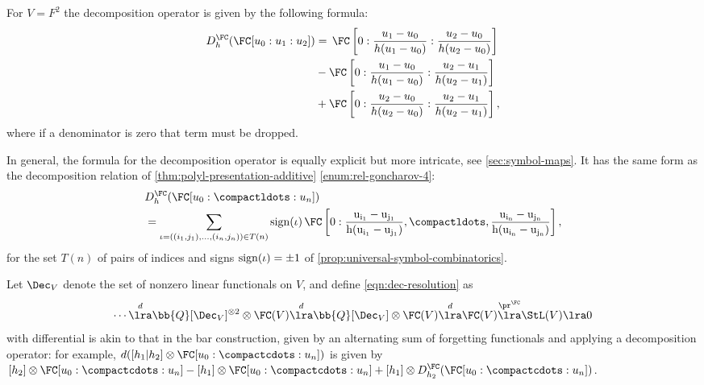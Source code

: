 \documentclass[a4paper]{amsart}
\begin{document}
\begin{example*}For $V = F^2$ the decomposition operator is given by the following formula:
\begin{align*}
D^\FC_h(\FC[u_0:u_1:u_2])
&=\,\FC\left[0:\frac{u_{1}-u_{0}}{h(u_{1}-u_0)}:\frac{u_{2}-u_{0}}{h(u_{2}-u_0)}\right]\\
&-\FC\left[0:\frac{u_{1}-u_{0}}{h(u_{1}-u_0)}:\frac{u_{2}-u_{1}}{h(u_{2}-u_1)}\right]\\
&+\FC\left[0:\frac{u_{2}-u_{0}}{h(u_{2}-u_0)}:\frac{u_{2}-u_{1}}{h(u_{2}-u_1)}\right],
\end{align*}
where if a denominator is zero that term must be dropped.
\end{example*}

In general, the formula for the decomposition operator is equally explicit but more intricate, see \cref{sec:symbol-maps}. It has the same form as the decomposition relation of \cref{thm:polyl-presentation-additive} \eqref{enum:rel-goncharov-4}:
\begin{align*}
    &D^\FC_h(\FC[u_0:\compactldots:u_n])\\
     &=\sum_{\iota=((i_1,j_1),\ldots,(i_{n},j_n))\in T(n)}\rm{sign}(\iota)\,
     \FC\left[0:\frac{u_{i_1}-u_{j_1}}{h(u_{i_1}-u_{j_1})},\compactldots,\frac{u_{i_n}-u_{j_n}}{h(u_{i_n}-u_{j_n})}\right],
\end{align*}
for the set $T(n)$ of pairs of indices and signs $\rm{sign}(\iota)=\pm 1$ of \cref{prop:universal-symbol-combinatorics}.

Let $\Dec_{V}$ denote the set of nonzero linear functionals on $V$, and define \eqref{eqn:dec-resolution} as
\[\cdots \overset{d}\lra \bb{Q}[\Dec_{V}]^{\otimes 2} \otimes \FC(V) \overset{d}\lra \bb{Q}[\Dec_{V}] \otimes \FC(V) \overset{d}\lra \FC(V) \overset{\pr^\FC}\lra \StL(V)\lra 0\]
with differential is akin to that in the bar construction, given by an alternating sum of forgetting functionals and applying a decomposition operator: for example, $d([h_1|h_2] \otimes \FC[u_0 : \compactcdots : u_n])$ is given by $[h_2] \otimes \FC[u_0 : \compactcdots : u_n]-[h_1] \otimes \FC[u_0 : \compactcdots : u_n]+[h_1] \otimes D_{h_2}^\FC(\FC[u_0 : \compactcdots : u_n])$.
\end{document}
